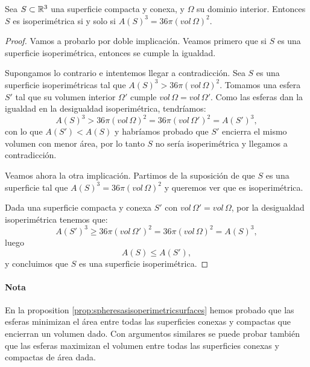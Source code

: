 \begin{corolario}\label{cor2}
Sea $S \subset \mathbb{R}^3$ una superficie compacta y conexa, y $\Omega$ su dominio interior. Entonces $S$ es isoperimétrica si y solo si $A(S)^3 = 36\pi (vol \, \Omega)^2$.
\end{corolario}
\begin{proof}
Vamos a probarlo por doble implicación. Veamos primero que si $S$ es una superficie isoperimétrica, entonces se cumple la igualdad.

Supongamos lo contrario e intentemos llegar a contradicción. Sea $S$ es una superficie isoperimétricas tal que $A(S)^3 > 36\pi (vol \, \Omega)^2$. Tomamos una esfera $S'$ tal que su volumen interior $\Omega'$ cumple $vol \, \Omega = vol \, \Omega'$. Como las esferas dan la igualdad en la desigualdad isoperimétrica, tendríamos:
%
\begin{equation*}
    A(S)^3 > 36\pi (vol \, \Omega)^2 = 36\pi (vol \, \Omega')^2 = A(S')^3,
\end{equation*}
%
con lo que $A(S') < A(S)$ y habríamos probado que $S'$ encierra el mismo volumen con menor área, por lo tanto $S$ no sería isoperimétrica y llegamos a contradicción.

Veamos ahora la otra implicación. Partimos de la suposición de que $S$ es una superficie tal que $A(S)^3 = 36\pi (vol \, \Omega)^2$ y queremos ver que es isoperimétrica.

Dada una superficie compacta y conexa $S'$ con $vol \, \Omega' = vol \, \Omega$, por la desigualdad isoperimétrica tenemos que:
%
\begin{equation*}
    A(S')^3 \geq 36\pi (vol \, \Omega')^2 = 36\pi(vol \, \Omega)^2 = A(S)^3,
\end{equation*}
%
luego
%
\begin{equation*}
    A(S) \leq A(S'),
\end{equation*}
%
y concluimos que $S$ es una superficie isoperimétrica.
\end{proof}

\paragraph{Nota}{En la proposition \ref{prop:spheresasisoperimetricsurfaces} hemos probado que las esferas minimizan el área entre todas las superficies conexas y compactas que encierran un volumen dado. Con argumentos similares se puede probar también que las esferas maximizan el volumen entre todas las superficies conexas y compactas de área dada.}

